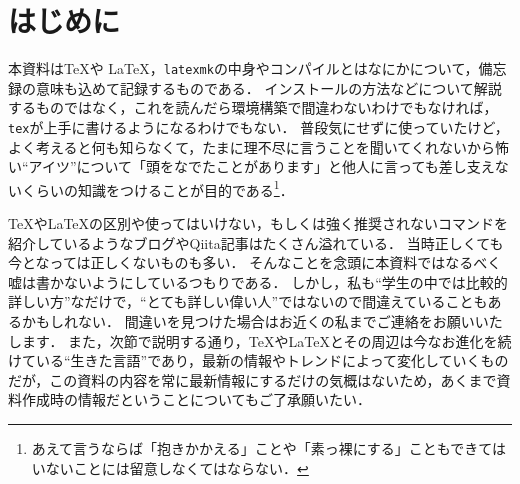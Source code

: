 \documentclass[./main]{subfiles}
\begin{document}
\section{はじめに}
\noindent
本資料は\TeX や \LaTeX ，\verb|latexmk|の中身やコンパイルとはなにかについて，備忘録の意味も込めて記録するものである．
インストールの方法などについて解説するものではなく，これを読んだら環境構築で間違わないわけでもなければ，\verb|tex|が上手に書けるようになるわけでもない．
普段気にせずに使っていたけど，よく考えると何も知らなくて，たまに理不尽に言うことを聞いてくれないから怖い``アイツ''について「頭をなでたことがあります」と他人に言っても差し支えないくらいの知識をつけることが目的である\footnote{あえて言うならば「抱きかかえる」ことや「素っ裸にする」こともできてはいないことには留意しなくてはならない．}．

\TeX や\LaTeX の区別や使ってはいけない，もしくは強く推奨されないコマンドを紹介しているようなブログやQiita記事はたくさん溢れている．
当時正しくても今となっては正しくないものも多い．
そんなことを念頭に本資料ではなるべく嘘は書かないようにしているつもりである．
しかし，私も``学生の中では比較的詳しい方''なだけで，``とても詳しい偉い人''ではないので間違えていることもあるかもしれない．
間違いを見つけた場合はお近くの私までご連絡をお願いいたします．
また，次節で説明する通り，\TeX や\LaTeX とその周辺は今なお進化を続けている``生きた言語''であり，最新の情報やトレンドによって変化していくものだが，この資料の内容を常に最新情報にするだけの気概はないため，あくまで資料作成時の情報だということについてもご了承願いたい．


\ifSubfilesClassLoaded{%
  \printbibliography
}{}
\end{document}
